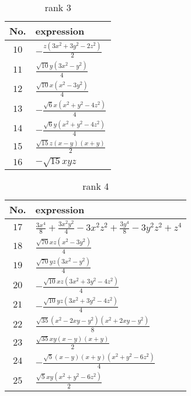 \documentclass[fleqn,8pt,landscape]{jsarticle}
\begin{document}
\begin{table}[ht!]
\begin{center}
\caption{rank 3}
\renewcommand{\arraystretch}{1.3}
\begin{tabular}{cl} \hline \hline
No. & expression \\ \hline
$ 10 $ & $ - \frac{z \left(3 x^{2} + 3 y^{2} - 2 z^{2}\right)}{2} $ \\
$ 11 $ & $ \frac{\sqrt{10} y \left(3 x^{2} - y^{2}\right)}{4} $ \\
$ 12 $ & $ \frac{\sqrt{10} x \left(x^{2} - 3 y^{2}\right)}{4} $ \\
$ 13 $ & $ - \frac{\sqrt{6} x \left(x^{2} + y^{2} - 4 z^{2}\right)}{4} $ \\
$ 14 $ & $ - \frac{\sqrt{6} y \left(x^{2} + y^{2} - 4 z^{2}\right)}{4} $ \\
$ 15 $ & $ \frac{\sqrt{15} z \left(x - y\right) \left(x + y\right)}{2} $ \\
$ 16 $ & $ - \sqrt{15} x y z $ \\
 \hline \hline
\end{tabular}
\end{center}
\end{table}
\begin{table}[ht!]
\begin{center}
\caption{rank 4}
\renewcommand{\arraystretch}{1.3}
\begin{tabular}{cl} \hline \hline
No. & expression \\ \hline
$ 17 $ & $ \frac{3 x^{4}}{8} + \frac{3 x^{2} y^{2}}{4} - 3 x^{2} z^{2} + \frac{3 y^{4}}{8} - 3 y^{2} z^{2} + z^{4} $ \\
$ 18 $ & $ \frac{\sqrt{70} x z \left(x^{2} - 3 y^{2}\right)}{4} $ \\
$ 19 $ & $ \frac{\sqrt{70} y z \left(3 x^{2} - y^{2}\right)}{4} $ \\
$ 20 $ & $ - \frac{\sqrt{10} x z \left(3 x^{2} + 3 y^{2} - 4 z^{2}\right)}{4} $ \\
$ 21 $ & $ - \frac{\sqrt{10} y z \left(3 x^{2} + 3 y^{2} - 4 z^{2}\right)}{4} $ \\
$ 22 $ & $ \frac{\sqrt{35} \left(x^{2} - 2 x y - y^{2}\right) \left(x^{2} + 2 x y - y^{2}\right)}{8} $ \\
$ 23 $ & $ \frac{\sqrt{35} x y \left(x - y\right) \left(x + y\right)}{2} $ \\
$ 24 $ & $ - \frac{\sqrt{5} \left(x - y\right) \left(x + y\right) \left(x^{2} + y^{2} - 6 z^{2}\right)}{4} $ \\
$ 25 $ & $ \frac{\sqrt{5} x y \left(x^{2} + y^{2} - 6 z^{2}\right)}{2} $ \\
 \hline \hline
\end{tabular}
\end{center}
\end{table}
\end{document}
